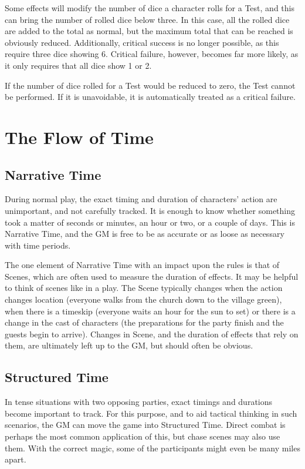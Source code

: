 Some effects will modify the number of dice a character rolls for a Test, and this can bring the number of rolled dice below three.
In this case, all the rolled dice are added to the total as normal, but the maximum total that can be reached is obviously reduced.
Additionally, critical success is no longer possible, as this require three dice showing 6.
Critical failure, however, becomes far more likely, as it only requires that all dice show 1 or 2.

If the number of dice rolled for a Test would be reduced to zero, the Test cannot be performed.
If it is unavoidable, it is automatically treated as a critical failure.

\section{The Flow of Time}

\subsection{Narrative Time}

During normal play, the exact timing and duration of characters' action are unimportant, and not carefully tracked.
It is enough to know whether something took a matter of seconds or minutes, an hour or two, or a couple of days.
This is Narrative Time, and the GM is free to be as accurate or as loose as necessary with time periods.

The one element of Narrative Time with an impact upon the rules is that of Scenes, which are often used to measure the duration of effects.
It may be helpful to think of scenes like in a play.
The Scene typically changes when the action changes location (everyone walks from the church down to the village green), when there is a timeskip (everyone waits an hour for the sun to set) or there is a change in the cast of characters (the preparations for the party finish and the guests begin to arrive).
Changes in Scene, and the duration of effects that rely on them, are ultimately left up to the GM, but should often be obvious.

\subsection{Structured Time}

In tense situations with two opposing parties, exact timings and durations become important to track.
For this purpose, and to aid tactical thinking in such scenarios, the GM can move the game into Structured Time.
Direct combat is perhaps the most common application of this, but chase scenes may also use them.
With the correct magic, some of the participants might even be many miles apart.

